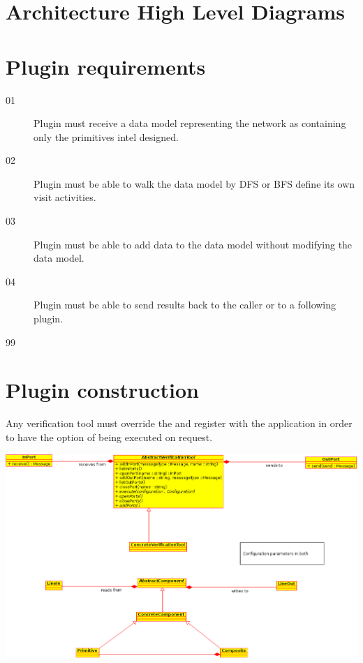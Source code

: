 \section{Architecture High Level Diagrams}



\section{Plugin requirements}

\begin{description}
	\item[01] Plugin must receive a data model representing the
	network as containing only the primitives intel designed.

	\item[02] Plugin must be able to walk the data model by DFS or BFS 
	define its own visit activities.

	\item[03] Plugin must be able to add data to the data model without
	modifying the data model.
	
	\item[04] Plugin must be able to send results back to the caller
	or to a following plugin.
	
	\item[99] 
\end{description}

\section{Plugin construction}

Any verification tool must override the  
and register with the application in order to have the option
of being executed on request. 



\begin{center}
	\includegraphics[width=.9\linewidth]{PluginClassDiagram}
	\label{fig:plugin-class-diagram}
\end{center}

